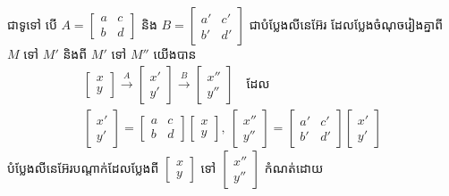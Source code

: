 ជាទូទៅ បើ $A = \begin{bmatrix} a & c\\ b & d \end{bmatrix}$ និង $B = \begin{bmatrix} a' & c'\\ b' & d' \end{bmatrix}$ ជាបំប្លែងលីនេអ៊ែរ ដែលប្លែងចំណុចរៀងគ្នាពី $M$ ទៅ $M'$ និងពី $M'$ ទៅ $M''$ យើងបាន
\[
\begin{gathered}
\begin{bmatrix} x\\ y \end{bmatrix} \xrightarrow{A} \begin{bmatrix} x'\\ y' \end{bmatrix} \xrightarrow{B} \begin{bmatrix} x''\\ y'' \end{bmatrix} \quad \text{ដែល}\\
\begin{bmatrix} x'\\ y' \end{bmatrix} = \begin{bmatrix} a & c\\ b & d \end{bmatrix}\begin{bmatrix} x\\ y \end{bmatrix}, \ \begin{bmatrix} x''\\ y'' \end{bmatrix} = \begin{bmatrix} a' & c'\\ b' & d' \end{bmatrix}\begin{bmatrix} x'\\ y' \end{bmatrix}
\end{gathered}
\]
បំប្លែងលីនេអ៊ែរបណ្ដាក់ដែលប្លែងពី $\begin{bmatrix} x\\ y \end{bmatrix}$ ទៅ $\begin{bmatrix} x''\\ y'' \end{bmatrix}$ កំណត់ដោយ
